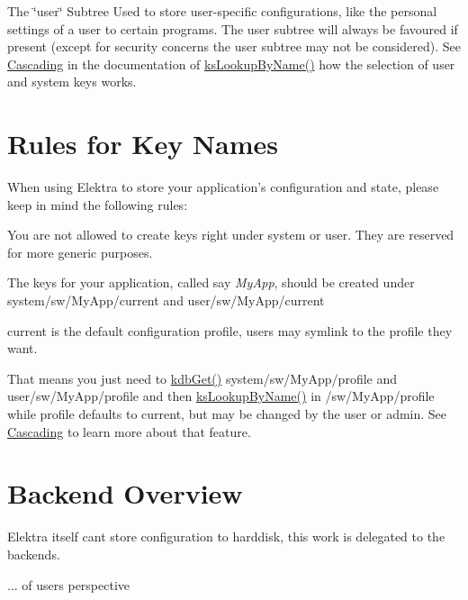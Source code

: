 \begin{DoxyItemize}
\item The \char`\"{}user\char`\"{} Subtree Used to store user-\/specific configurations, like the personal settings of a user to certain programs. The user subtree will always be favoured if present (except for security concerns the user subtree may not be considered). See \hyperlink{group__keyset_cascading}{Cascading} in the documentation of \hyperlink{group__keyset_gad2e30fb6d4739d917c5abb2ac2f9c1a1}{ksLookupByName()} how the selection of user and system keys works.
\end{DoxyItemize}\hypertarget{index_rules}{}\section{Rules for Key Names}\label{index_rules}
When using Elektra to store your application's configuration and state, please keep in mind the following rules:
\begin{DoxyItemize}
\item You are not allowed to create keys right under {\ttfamily system} or {\ttfamily user}. They are reserved for more generic purposes.
\item The keys for your application, called say {\itshape MyApp\/}, should be created under {\ttfamily system/sw/MyApp/current} and {\ttfamily user/sw/MyApp/current} 
\item current is the default configuration profile, users may symlink to the profile they want.
\item That means you just need to \hyperlink{group__kdb_ga28e385fd9cb7ccfe0b2f1ed2f62453a1}{kdbGet()} {\ttfamily system/sw/MyApp/profile} and {\ttfamily user/sw/MyApp/profile} and then \hyperlink{group__keyset_gad2e30fb6d4739d917c5abb2ac2f9c1a1}{ksLookupByName()} in {\ttfamily /sw/MyApp/profile} while profile defaults to current, but may be changed by the user or admin. See \hyperlink{group__keyset_cascading}{Cascading} to learn more about that feature.
\end{DoxyItemize}\hypertarget{index_backendsoverview}{}\section{Backend Overview}\label{index_backendsoverview}
Elektra itself cant store configuration to harddisk, this work is delegated to the backends.


\begin{DoxyItemize}
\item ... of users perspective
\end{DoxyItemize}


